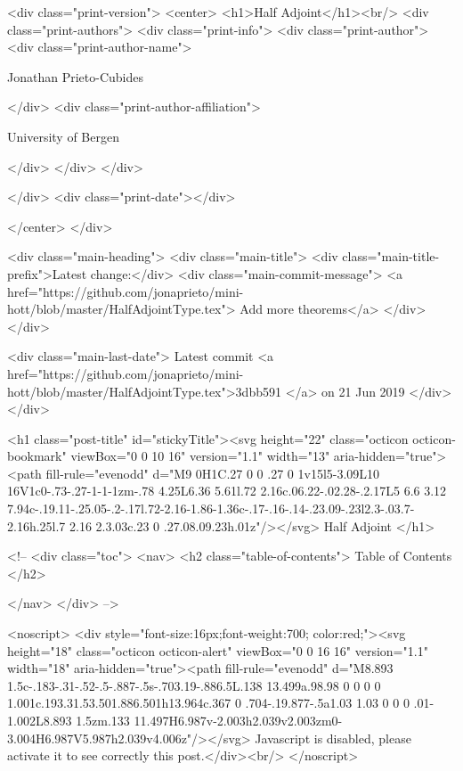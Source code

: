   <div class="print-version">
    <center>
      <h1>Half Adjoint</h1><br/>
        <div class="print-authors">
          <div class="print-info">
            <div class="print-author">
              <div class="print-author-name">
                
                  Jonathan Prieto-Cubides
                
              </div>
              <div class="print-author-affiliation">
                
                  University of Bergen
                
                </div>
            </div>
          </div>
          
          
        </div>
        <div class="print-date"></div>
        
        
    </center>
  </div>

  
  <div class="main-heading">
    <div class="main-title">
      <div class="main-title-prefix">Latest change:</div>
      <div class="main-commit-message">
            <a href="https://github.com/jonaprieto/mini-hott/blob/master/HalfAdjointType.tex">
              Add more theorems</a>
      </div>
    </div>

    <div class="main-last-date">
      Latest commit <a href="https://github.com/jonaprieto/mini-hott/blob/master/HalfAdjointType.tex">3dbb591 </a> on  21 Jun 2019
    </div>
  </div>
  
  <h1 class="post-title" id="stickyTitle"><svg height="22" class="octicon octicon-bookmark" viewBox="0 0 10 16" version="1.1" width="13" aria-hidden="true"><path fill-rule="evenodd" d="M9 0H1C.27 0 0 .27 0 1v15l5-3.09L10 16V1c0-.73-.27-1-1-1zm-.78 4.25L6.36 5.61l.72 2.16c.06.22-.02.28-.2.17L5 6.6 3.12 7.94c-.19.11-.25.05-.2-.17l.72-2.16-1.86-1.36c-.17-.16-.14-.23.09-.23l2.3-.03.7-2.16h.25l.7 2.16 2.3.03c.23 0 .27.08.09.23h.01z"/></svg> Half Adjoint
  </h1>

  <!-- 
  <div class="toc">
    <nav>
    <h2 class="table-of-contents"> Table of Contents </h2>
      

    </nav>
  </div>
   -->

  <noscript>
  <div style="font-size:16px;font-weight:700; color:red;"><svg height="18" class="octicon octicon-alert" viewBox="0 0 16 16" version="1.1" width="18" aria-hidden="true"><path fill-rule="evenodd" d="M8.893 1.5c-.183-.31-.52-.5-.887-.5s-.703.19-.886.5L.138 13.499a.98.98 0 0 0 0 1.001c.193.31.53.501.886.501h13.964c.367 0 .704-.19.877-.5a1.03 1.03 0 0 0 .01-1.002L8.893 1.5zm.133 11.497H6.987v-2.003h2.039v2.003zm0-3.004H6.987V5.987h2.039v4.006z"/></svg> Javascript is disabled, please activate it to see correctly this post.</div><br/>
  </noscript>

